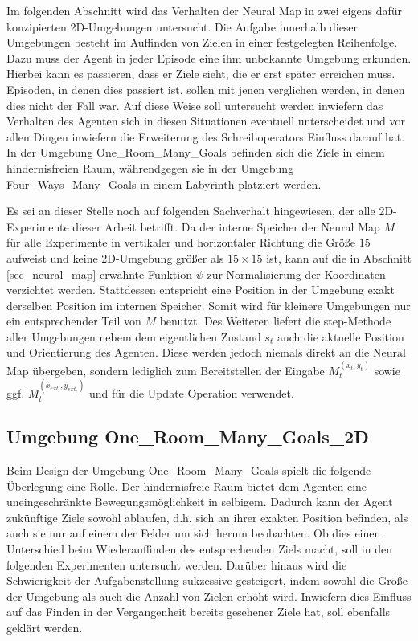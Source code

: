 Im folgenden Abschnitt wird das Verhalten der Neural Map in zwei eigens dafür konzipierten 2D-Umgebungen untersucht. Die Aufgabe innerhalb dieser Umgebungen besteht im Auffinden von Zielen in einer festgelegten Reihenfolge. Dazu muss der Agent in jeder Episode eine ihm unbekannte Umgebung erkunden. Hierbei kann es passieren, dass er Ziele sieht, die er erst später erreichen muss. Episoden, in denen dies passiert ist, sollen mit jenen verglichen werden, in denen dies nicht der Fall war. Auf diese Weise soll untersucht werden inwiefern das Verhalten des Agenten sich in diesen Situationen eventuell unterscheidet und vor allen Dingen inwiefern die Erweiterung des Schreiboperators Einfluss darauf hat. In der Umgebung \glqq One\_Room\_Many\_Goals\grqq{} befinden sich die Ziele in einem hindernisfreien Raum, währendgegen sie in der Umgebung \glqq Four\_Ways\_Many\_Goals\grqq{} in einem Labyrinth platziert werden.

Es sei an dieser Stelle noch auf folgenden Sachverhalt hingewiesen, der alle 2D-Experimente dieser Arbeit betrifft. Da der interne Speicher der Neural Map $M$ für alle Experimente in vertikaler und horizontaler Richtung die Größe $15$ aufweist und keine 2D-Umgebung größer als $15 \times 15$ ist, kann auf die in Abschnitt \ref{sec_neural_map} erwähnte Funktion $\psi$ zur Normalisierung der Koordinaten verzichtet werden. Stattdessen entspricht eine Position in der Umgebung exakt derselben Position im internen Speicher. Somit wird für kleinere Umgebungen nur ein entsprechender Teil von $M$ benutzt. Des Weiteren liefert die step-Methode aller Umgebungen nebem dem eigentlichen Zustand $s_t$ auch die aktuelle Position und Orientierung des Agenten. Diese werden jedoch niemals direkt an die Neural Map übergeben, sondern lediglich zum Bereitstellen der Eingabe $M_t^{(x_t,y_t)}$ sowie ggf. $M_t^{(x_{ext_t},y_{ext_t})}$ und für die Update Operation verwendet.

\subsection{Umgebung \glqq One\_Room\_Many\_Goals\_2D\grqq}
\label{subsec_ormg}

Beim Design der Umgebung \glqq One\_Room\_Many\_Goals\grqq{} spielt die folgende Überlegung eine Rolle. Der hindernisfreie Raum bietet dem Agenten eine uneingeschränkte Bewegungsmöglichkeit in selbigem. Dadurch kann der Agent zukünftige Ziele sowohl ablaufen, d.h. sich an ihrer exakten Position befinden, als auch sie nur auf einem der Felder um sich herum beobachten. Ob dies einen Unterschied beim Wiederauffinden des entsprechenden Ziels macht, soll in den folgenden Experimenten untersucht werden. Darüber hinaus wird die Schwierigkeit der Aufgabenstellung sukzessive gesteigert, indem sowohl die Größe der Umgebung als auch die Anzahl von Zielen erhöht wird. Inwiefern dies Einfluss auf das Finden in der Vergangenheit bereits gesehener Ziele hat, soll ebenfalls geklärt werden.

